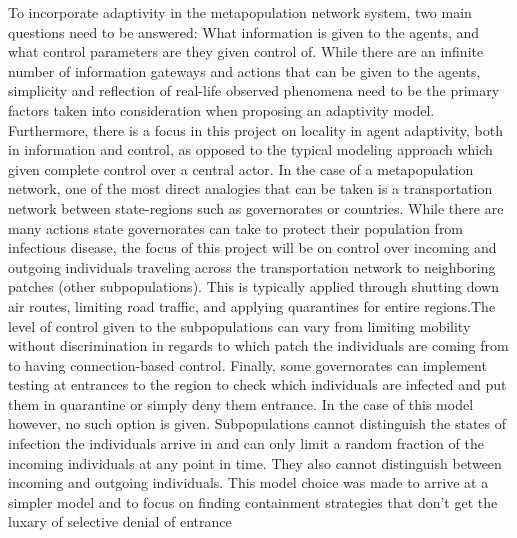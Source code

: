 To incorporate adaptivity in the metapopulation network system, two main questions need to be answered: What information is given to the agents, and what control parameters are they given control of. While there are an infinite number of information gateways and actions that can be given to the agents, simplicity and reflection of real-life observed phenomena need to be the primary factors taken into consideration when proposing an adaptivity model. Furthermore, there is a focus in this project on locality in agent adaptivity, both in information and control, as opposed to the typical modeling approach which given complete control over a central actor. In the case of a metapopulation network, one of the most direct analogies that can be taken is a transportation network between state-regions such as governorates or countries. While there are many actions state governorates can take to protect their population from infectious disease, the focus of this project will be on control over incoming and outgoing individuals traveling across the transportation network to neighboring patches (other subpopulations). This is typically applied through shutting down air routes, limiting road traffic, and applying quarantines for entire regions.The level of control given to the subpopulations can vary from limiting mobility without discrimination in regards to which patch the individuals are coming from to having connection-based control. Finally, some governorates can implement testing at entrances to the region to check which individuals are infected and put them in quarantine or simply deny them entrance. In the case of this model however, no such option is given. Subpopulations cannot distinguish the states of infection the individuals arrive in and can only limit a random fraction of the incoming individuals at any point in time. They also cannot distinguish between incoming and outgoing individuals. This model choice was made to arrive at a simpler model and to focus on finding containment strategies that don't get the luxary of selective denial of entrance\\

